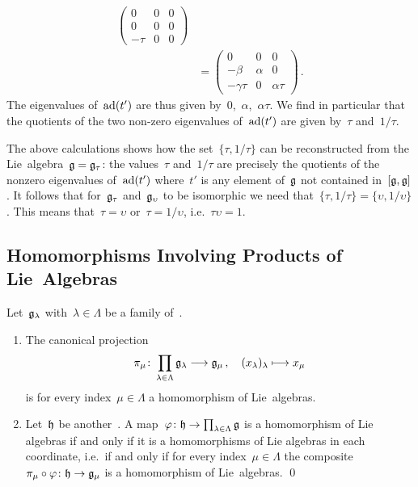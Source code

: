 \begin{example}
\begin{align*}
\begin{pmatrix}
      0     & 0 & 0 \\
      0     & 0 & 0 \\
      -\tau & 0 & 0
    \end{pmatrix}
    \\
    &=
    \begin{pmatrix}
       0          & 0       & 0           \\
      -\beta      & \alpha  & 0           \\
      -\gamma\tau & 0       & \alpha \tau
    \end{pmatrix} \,.
  \end{align*}
  The eigenvalues of~$\operatorname{ad}(t')$ are thus given by~$0$,~$\alpha$,~$\alpha \tau$.
  We find in particular that the quotients of the two non-zero eigenvalues of~$\operatorname{ad}(t')$ are given by~$\tau$ and~$1 / \tau$.

  The above calculations shows how the set~$\{ \tau, 1 / \tau \}$ can be reconstructed from the Lie~algebra~$\mathfrak{g} = \mathfrak{g}_\tau$:
  the values~$\tau$ and~$1/\tau$ are precisely the quotients of the nonzero eigenvalues of~$\operatorname{ad}(t')$ where~$t'$ is any element of~$\mathfrak{g}$ not contained in~$[\mathfrak{g}, \mathfrak{g}]$.
  It follows that for~$\mathfrak{g}_\tau$ and~$\mathfrak{g}_\upsilon$ to be isomorphic we need that~$\{ \tau , 1/\tau \} = \{ \upsilon, 1/\upsilon \}$.
  This means that~$\tau = \upsilon$ or~$\tau = 1 / \upsilon$, i.e.~$\tau \upsilon = 1$.
\end{example}



\subsection{Homomorphisms Involving Products of Lie~Algebras}


\begin{proposition}
  \label{products of lie algebras}
  Let~$\mathfrak{g}_\lambda$ with~$\lambda \in \Lambda$ be a family of~\liealgebras{$\kf$}.
  \begin{enumerate}
    \item
      The canonical projection
      \[
       \pi_\mu
       \colon
       \prod_{\lambda \in \Lambda} \glie_\lambda
       \to
       \glie_\mu \,,
       \quad
       ( x_\lambda )_\lambda
       \mapsto
       x_\mu
      \]
      is for every index~$\mu \in \Lambda$ a homomorphism of Lie~algebras.
    \item
      Let~$\mathfrak{h}$ be another~\liealgebra{$\kf$}.
      A map~$\varphi \colon \hlie \to \prod_{\lambda \in \Lambda} \glie$ is a homomorphism of Lie algebras if and only if it is a homomorphisms of Lie algebras in each coordinate, i.e.\ if and only if for every index~$\mu \in \Lambda$ the composite~$\pi_\mu \circ \varphi \colon \hlie \to \glie_\mu$ is a homomorphism of Lie~algebras.
    \qed
  \end{enumerate}
\end{proposition}


